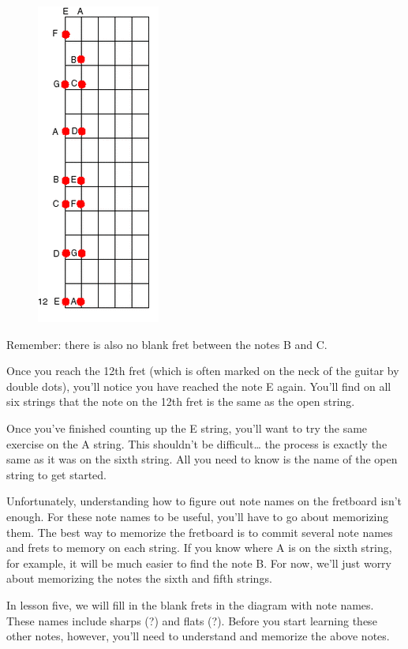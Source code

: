 \begin{figure}
\includegraphics{partfour/fretboard.png}
\end{figure}

Remember: there is also no blank fret between the notes B and C.

Once you reach the 12th fret (which is often marked on the neck of the guitar
by double dots), you'll notice you have reached the note E again. You'll find
on all six strings that the note on the 12th fret is the same as the open
string.

Once you've finished counting up the E string, you'll want to try the same
exercise on the A string. This shouldn't be difficult\ldots{} the process is exactly
the same as it was on the sixth string. All you need to know is the name of the
open string to get started.

Unfortunately, understanding how to figure out note names on the fretboard
isn't enough. For these note names to be useful, you'll have to go about
memorizing them. The best way to memorize the fretboard is to commit several
note names and frets to memory on each string. If you know where A is on the
sixth string, for example, it will be much easier to find the note B. For now,
we'll just worry about memorizing the notes the sixth and fifth strings.

In lesson five, we will fill in the blank frets in the diagram with note names.
These names include sharps (?) and flats (?). Before you start learning these
other notes, however, you'll need to understand and memorize the above notes.

